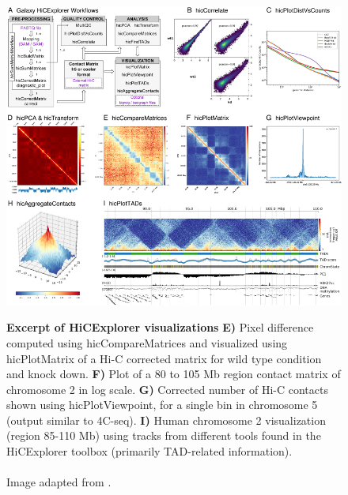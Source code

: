 
\begin{figure}[!htbp]
\begin{centering}
    {\includegraphics[scale=3.8,trim=37 0 0 45,clip]{figures/background/HiCExplorer.jpg}}
    \caption[Excerpt of HiCExplorer visualizations]
    {
        \textbf{Excerpt of HiCExplorer visualizations}
        \textbf{E)} Pixel difference computed using hicCompareMatrices and
        visualized using hicPlotMatrix of a Hi-C corrected matrix for wild type
        condition and knock down.
        \textbf{F)} Plot of a 80 to 105 Mb region contact matrix of chromosome 2 in log scale.
        \textbf{G)} Corrected number of Hi-C contacts shown using
        hicPlotViewpoint, for a single bin in chromosome 5 (output similar to
        4C-seq).
        \textbf{I)} Human chromosome 2 visualization (region 85-110 Mb) using
        tracks from different tools found in the HiCExplorer toolbox (primarily
        TAD-related information). \\
        \\Image adapted from \cite{wolff2018galaxy}.}
    \label{fig:comparison3C}\label{fig:HiCExplorer}
\end{centering}
\end{figure}




